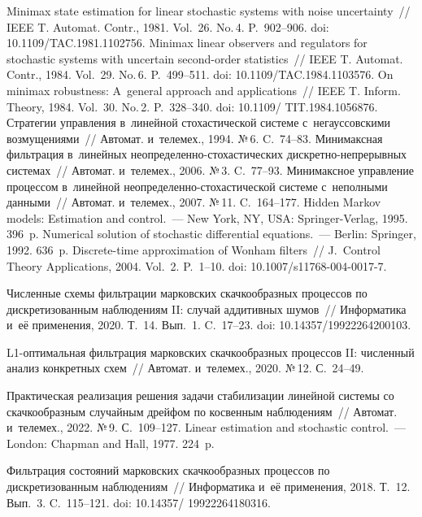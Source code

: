 \begin{multicols}{2}
{{\begin{thebibliography}{99}
 Minimax state estimation for linear stochastic systems with noise 
uncertainty~// IEEE T. Automat. Contr., 1981. Vol.~26. No.\,4. P.~902--906. doi: 
10.1109/TAC.1981.1102756.
       Minimax linear observers and regulators for stochastic systems 
with uncertain second-order statistics~// IEEE T. Automat. Contr., 1984. Vol.~29. No.\,6.  
P.~499--511. doi: 10.1109/TAC.1984.1103576.
 On minimax robustness: A~general approach and applications~// IEEE 
T. Inform. Theory, 1984. Vol.~30. No.\,2. P.~328--340. doi: 10.1109/ TIT.1984.1056876.
 Стратегии управ\-ле\-ния в~линейной сто\-ха\-сти\-че\-ской сис\-те\-ме 
с~негауссовскими возмущениями~// Автомат. и~телемех., 1994. №\,6. C.~74--83.
 Минимаксная фильт\-ра\-ция в~линейных  
не\-опре\-де\-лен\-но-сто\-ха\-сти\-че\-ских дис\-крет\-но-не\-пре\-рыв\-ных сис\-те\-мах~// 
Автомат. и~телемех., 2006. №\,3. C.~77--93.
 Минимаксное управ\-ле\-ние процессом в~линейной  
не\-опре\-де\-лен\-но-сто\-ха\-сти\-че\-ской сис\-те\-ме с~неполными данными~// Автомат. 
и~телемех., 2007. №\,11. C.~164--177.
 Hidden Markov models: Estimation and control.~--- 
New York, NY, USA: Springer-Verlag, 1995. 396~p.
 Numerical solution of stochastic differential equations.~--- 
Berlin: Springer, 1992. 636~p.
       Discrete-time approximation of Wonham filters~// 
J.~Control Theory Applications, 2004. Vol.~2. P.~1--10. doi: 10.1007/s11768-004-0017-7.

 Численные схемы фильтрации марковских скачкообразных 
процессов по дискретизованным наблюдениям II: случай аддитивных шумов~// 
Информатика и~её применения, 2020. Т.~14. Вып.~1. C.~17--23. doi: 
10.14357/19922264200103.


 L1-оп\-ти\-маль\-ная фильтрация марковских скачкообразных 
процессов II: численный анализ конкретных схем~// Автомат. и~телемех., 2020. №\,12. 
С.~24--49.

 Практическая реализация решения задачи стабилизации 
линейной сис\-те\-мы со скачкообразным случайным дрейфом по косвенным наблюдениям~// 
Автомат. и~телемех., 2022. №\,9. С.~109--127.
 Linear estimation and stochastic control.~--- London: Chapman and Hall, 
1977. 224~p.

 Фильтрация со\-сто\-яний марковских скачкообразных процессов по 
дискретизованным наблюдениям~// Информатика и~её применения, 2018. Т.~12. Вып.~3. 
C.~115--121. doi: 10.14357/ 19922264180316.


\end{thebibliography}

 }
 }

\end{multicols}

